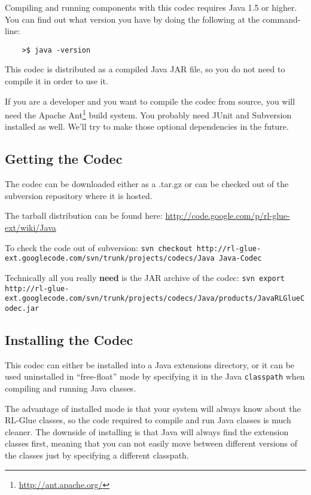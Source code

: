 \documentclass[11pt]{article}
\begin{document}
Compiling and running components with this codec requires Java 1.5 or higher. You can find out what version you have by doing the following at the command-line:
\begin{verbatim}
	>$ java -version
\end{verbatim}

This codec is distributed as a compiled Java JAR file, so you do not need to compile it in order to use it.

If you are a developer and you want to compile the codec from source, you will need the Apache Ant\footnote{\url{http://ant.apache.org/}} build system.  You probably need JUnit and Subversion installed as well. We'll try to make those optional dependencies in the future.


\subsection{Getting the Codec}
The codec can be downloaded either as a .tar.gz or can be checked out of the subversion repository where it is hosted.

The tarball distribution can be found here:\newline
\url{http://code.google.com/p/rl-glue-ext/wiki/Java}


To check the code out of subversion:\newline
\texttt{svn checkout http://rl-glue-ext.googlecode.com/svn/trunk/projects/codecs/Java Java-Codec}

Technically all you really \textbf{need} is the JAR archive of the codec:\newline
\footnotesize \texttt{svn export http://rl-glue-ext.googlecode.com/svn/trunk/projects/codecs/Java/products/JavaRLGlueCodec.jar} \normalsize

\subsection{Installing the Codec}
This codec can either be installed into a Java extensions directory, or it can be used uninstalled in ``free-float'' mode by specifying it in the Java \texttt{classpath} when compiling and running Java classes.

The advantage of installed mode is that your system will always know about the RL-Glue classes, so the code required to compile and run Java classes is much cleaner.  The downside of installing is that Java will always find the extension classes first, meaning that you can not easily move between different versions of the classes just by specifying a different classpath.
\end{document}
